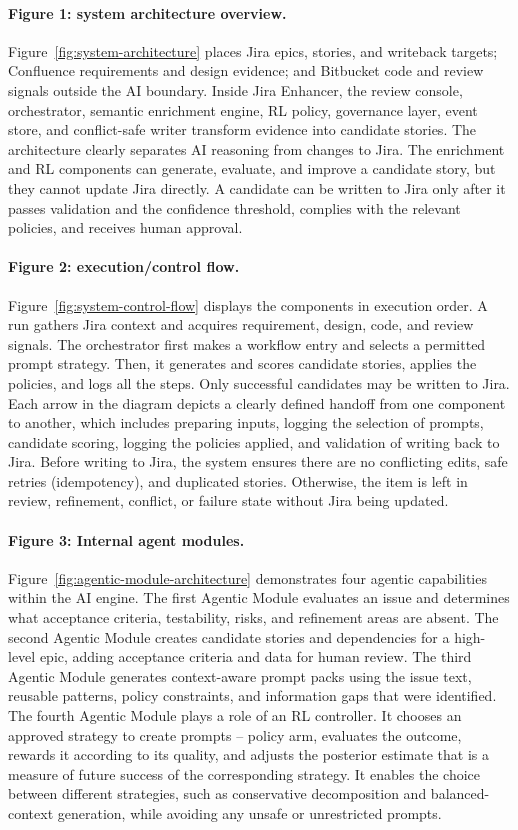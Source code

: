 \documentclass[manuscript,review]{acmart}
\begin{document}
\paragraph{Figure 1: system architecture overview.}
Figure~\ref{fig:system-architecture} places Jira epics, stories, and writeback targets; Confluence requirements and design evidence; and Bitbucket code and review signals outside the AI boundary. Inside Jira Enhancer, the review console, orchestrator, semantic enrichment engine, RL policy, governance layer, event store, and conflict-safe writer transform evidence into candidate stories. The architecture clearly separates AI reasoning from changes to Jira. The enrichment and RL components can generate, evaluate, and improve a candidate story, but they cannot update Jira directly. A candidate can be written to Jira only after it passes validation and the confidence threshold, complies with the relevant policies, and receives human approval.

\paragraph{Figure 2: execution/control flow.}
Figure~\ref{fig:system-control-flow} displays the components in execution order. A run gathers Jira context and acquires requirement, design, code, and review signals. The orchestrator first makes a workflow entry and selects a permitted prompt strategy. Then, it generates and scores candidate stories, applies the policies, and logs all the steps. Only successful candidates may be written to Jira. Each arrow in the diagram depicts a clearly defined handoff from one component to another, which includes preparing inputs, logging the selection of prompts, candidate scoring, logging the policies applied, and validation of writing back to Jira. Before writing to Jira, the system ensures there are no conflicting edits, safe retries (idempotency), and duplicated stories. Otherwise, the item is left in review, refinement, conflict, or failure state without Jira being updated.

\paragraph{Figure 3: Internal agent modules.}
Figure~\ref{fig:agentic-module-architecture} demonstrates four agentic capabilities within the AI engine. The first Agentic Module evaluates an issue and determines what acceptance criteria, testability, risks, and refinement areas are absent. The second Agentic Module creates candidate stories and dependencies for a high-level epic, adding acceptance criteria and data for human review. The third Agentic Module generates context-aware prompt packs using the issue text, reusable patterns, policy constraints, and information gaps that were identified. The fourth Agentic Module plays a role of an RL controller. It chooses an approved strategy to create prompts -- policy arm, evaluates the outcome, rewards it according to its quality, and adjusts the posterior estimate that is a measure of future success of the corresponding strategy. It enables the choice between different strategies, such as conservative decomposition and balanced-context generation, while avoiding any unsafe or unrestricted prompts.
\end{document}
